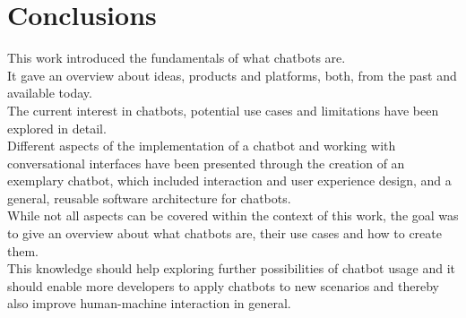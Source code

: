 \chapter{Conclusions}

This work introduced the fundamentals of what chatbots are.
\\
It gave an overview about ideas, products and platforms, both, from the past and available today.
\\
The current interest in chatbots, potential use cases and limitations have been explored in detail.
\\
Different aspects of the implementation of a chatbot and working with conversational interfaces
have been presented through the creation of an exemplary chatbot,
which included interaction and user experience design, and a general, reusable software architecture for chatbots.
\\

While not all aspects can be covered within the context of this work,
the goal was to give an overview about what chatbots are, their use cases and how to create them.
\\

This knowledge should help exploring further possibilities of chatbot usage
and it should enable more developers to apply chatbots to new scenarios and thereby also improve human-machine interaction in general.
